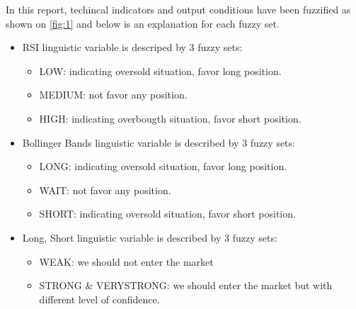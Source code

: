 \documentclass{article}
\begin{document}
In this report, techincal indicators and output conditions have been fuzzified as shown on \cref*{fig:1} and below is an explanation 
for each fuzzy set.
\begin{itemize}
    \item {RSI linguistic variable is descriped by 3 fuzzy sets:
    \begin{itemize} 
        \item LOW: indicating oversold situation, favor long position.
        \item MEDIUM: not favor any position.
        \item HIGH: indicating overbougth situation, favor short position.
    \end{itemize}
    }
    \item {Bollinger Bands linguistic variable is described by 3 fuzzy sets:
    \begin{itemize} 
        \item LONG: indicating oversold situation, favor long position.
        \item WAIT: not favor any position.
        \item SHORT: indicating oversold situation, favor short position. 
    \end{itemize}
    }
    \item {Long, Short linguistic variable is described by 3 fuzzy sets:
    \begin{itemize} 
        \item WEAK: we should not enter the market
        \item STRONG \& VERYSTRONG: we should enter the market but with different level of confidence.
    \end{itemize}
    }
\end{itemize}
\end{document}
